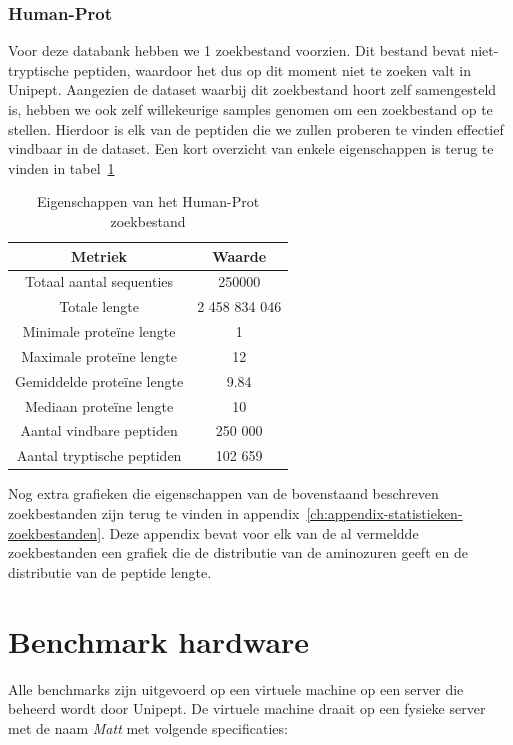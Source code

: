 \documentclass[11pt,dutch,faculty=we,layout=titlefont,underline=false,titleUppercase=true,titleUnderline=true]{ugent2016-report}
\begin{document}
    \subsubsection{Human-Prot}
    Voor deze databank hebben we 1 zoekbestand voorzien.
    Dit bestand bevat niet-tryptische peptiden, waardoor het dus op dit moment niet te zoeken valt in Unipept.
    Aangezien de dataset waarbij dit zoekbestand hoort zelf samengesteld is, hebben we ook zelf willekeurige samples genomen om een zoekbestand op te stellen.
    Hierdoor is elk van de peptiden die we zullen proberen te vinden effectief vindbaar in de dataset.
    Een kort overzicht van enkele eigenschappen is terug te vinden in tabel~\ref{tab:humanprot_zoekbestand}

    \begin{table}[h!]
        \centering
        \begin{tabular}{ c c }
            Metriek                    & Waarde        \\
            \hline\hline
            Totaal aantal sequenties   & 250000        \\
            Totale lengte              & 2 458 834 046 \\
            Minimale proteïne lengte   & 1             \\
            Maximale proteïne lengte   & 12            \\
            Gemiddelde proteïne lengte & 9.84          \\
            Mediaan proteïne lengte    & 10            \\
            Aantal vindbare peptiden   & 250 000       \\
            Aantal tryptische peptiden & 102 659       \\
            \hline
        \end{tabular}
        \caption{Eigenschappen van het Human-Prot zoekbestand}
        \label{tab:humanprot_zoekbestand}
    \end{table}


    Nog extra grafieken die eigenschappen van de bovenstaand beschreven zoekbestanden zijn terug te vinden in appendix~\ref{ch:appendix-statistieken-zoekbestanden}.
    Deze appendix bevat voor elk van de al vermeldde zoekbestanden een grafiek die de distributie van de aminozuren geeft en de distributie van de peptide lengte.

    \section{Benchmark hardware}\label{sec:benchmark-hardware}
    Alle benchmarks zijn uitgevoerd op een virtuele machine op een server die beheerd wordt door Unipept.
    De virtuele machine draait op een fysieke server met de naam \textit{Matt} met volgende specificaties:
\end{document}
